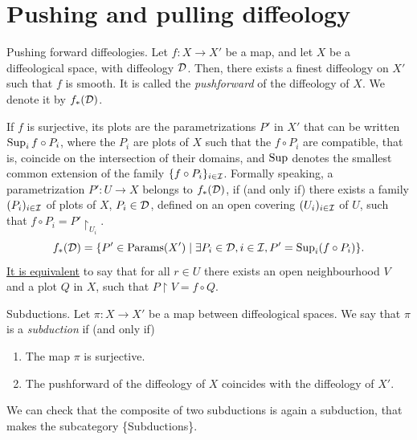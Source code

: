 \section{Pushing and pulling diffeology}


\begin{Article}{Pushing forward diffeologies.}
  Let $f \colon X \to X'$ be a map,
  and let $X$ be a diffeological space,
  with diffeology $\mathcal{D}$.
  Then,
  there exists a finest diffeology on $X'$ such that $f$ is smooth.
  It is called the \emph{pushforward} of the diffeology of $X$.
  We denote it by $f_*(\mathcal{D})$.
  
  If $f$ is surjective,
  its plots are the parametrizations $P'$ in $X'$ that can be written $\operatorname{Sup}_i f \circ P_i$,
  where the $P_i$ are plots of $X$ such that the $f \circ P_i$ are compatible,
  that is,
  coincide on the intersection of their domains,
  and $\operatorname{Sup}$ denotes the smallest common extension of the family $\{f\circ P_i\}_{i\in \mathcal{I}}$.
  Formally speaking,
  a parametrization $P' \colon U \to X$ belongs to $f_*(\mathcal{D})$,
  if (and only if) there exists a family $(P_i)_{i \in \mathcal{I}}$ of plots of $X$,
  $P_i \in \mathcal{D}$,
  defined on an open covering $(U_i)_{i \in \mathcal{I}}$ of $U$,
  such that $f \circ P_i = P' \restriction_{U_i}$.
  $$%
    f_*(\cD) = \{ P' \in \Params(X') \mid \exists P_i \in \cD, i \in \cI, P' = \Sup_i(f\circ P_i) \}.
    $$%
  \uline{It is equivalent} to say that for all $r \in U$ there exists an open neighbourhood $V$ and a plot $Q$ in $X$,
  such that $P \restriction V = f \circ Q$.
\end{Article}

\begin{Article}{Subductions.}
  Let $\pi \colon X \to X'$ be a map between diffeological spaces.
  We say that $\pi$ is a \emph{subduction} if (and only if)
  
  \begin{enumerate}
    \item The map $\pi$ is surjective.
    \item The pushforward of the diffeology of $X$ coincides with the diffeology of $X'$.
  \end{enumerate}
  
  We can check that the composite of two subductions is again a subduction,
  that makes the subcategory \{Subductions\}.
\end{Article}

